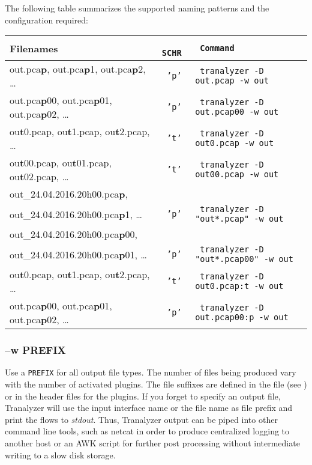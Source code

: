 The following table summarizes the supported naming patterns and the configuration required:
\begin{longtable}{l>{\tt}l>{\tt}l}
    \toprule
    {\bf Filenames} & {\bf SCHR} & {\bf Command}\\
    \midrule\endhead%
    out.pca{\bf p}, out.pca{\bf p}1, out.pca{\bf p}2, \ldots     & 'p' & tranalyzer -D out.pcap -w out\\
    out.pca{\bf p}00, out.pca{\bf p}01, out.pca{\bf p}02, \ldots & 'p' & tranalyzer -D out.pcap00 -w out\\
    ou{\bf t}0.pcap, ou{\bf t}1.pcap, ou{\bf t}2.pcap, \ldots    & 't' & tranalyzer -D out0.pcap -w out\\
    ou{\bf t}00.pcap, ou{\bf t}01.pcap, ou{\bf t}02.pcap, \ldots & 't' & tranalyzer -D out00.pcap -w out\\
    out\_24.04.2016.20h00.pca{\bf p},                            &     & \\
    \qquad out\_24.04.2016.20h00.pca{\bf p}1, \ldots             & 'p' & tranalyzer -D "out*.pcap" -w out\\
    out\_24.04.2016.20h00.pca{\bf p}00,                          &     & \\
    \qquad out\_24.04.2016.20h00.pca{\bf p}01, \ldots            & 'p' & tranalyzer -D "out*.pcap00" -w out\\
    ou{\bf t}0.pcap, ou{\bf t}1.pcap, ou{\bf t}2.pcap, \ldots    & 't' & tranalyzer -D out0.pcap:t -w out\\
    out.pca{\bf p}00, out.pca{\bf p}01, out.pca{\bf p}02, \ldots & 'p' & tranalyzer -D out.pcap00:p -w out\\
    \bottomrule
\end{longtable}

\subsubsection{--w PREFIX}
Use a {\tt PREFIX} for all output file types. The number of files being produced vary with the number of activated plugins. The file suffixes are defined in the file  (see ) or in the header files for the plugins. If you forget to specify an output file, Tranalyzer will use the input interface name or the file name as file prefix and print the flows to {\em stdout}. Thus, Tranalyzer output can be piped into other command line tools, such as netcat in order to produce centralized logging to another host or an AWK script for further post processing without intermediate writing to a slow disk storage.

